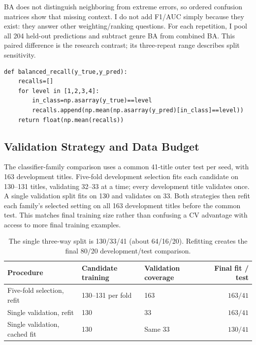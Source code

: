 \documentclass[11pt,letterpaper]{article}
\begin{document}
BA does not distinguish neighboring from extreme errors, so ordered confusion matrices show that missing context. I do not add F1/AUC simply because they exist: they answer other weighting/ranking questions. For each repetition, I pool all 204 held-out predictions and subtract genre BA from combined BA. This paired difference is the research contrast; its three-repeat range describes split sensitivity.

\begin{lstlisting}[caption={Manual balanced recall averages success within the four true categories; the notebook checks all pooled primary scores against this calculation.}]
def balanced_recall(y_true,y_pred):
    recalls=[]
    for level in [1,2,3,4]:
        in_class=np.asarray(y_true)==level
        recalls.append(np.mean(np.asarray(y_pred)[in_class]==level))
    return float(np.mean(recalls))
\end{lstlisting}


\subsection{Validation Strategy and Data Budget}
The classifier-family comparison uses a common 41-title outer test per seed, with 163 development titles. Five-fold development selection fits each candidate on 130--131 titles, validating 32--33 at a time; every development title validates once. A single validation split fits on 130 and validates on 33. Both strategies then refit each family's selected setting on all 163 development titles before the common test. This matches final training size rather than confusing a CV advantage with access to more final training examples.

\begin{table}[htbp]\centering\small
\begin{tabular}{@{}p{.31\linewidth}p{.23\linewidth}p{.20\linewidth}r@{}}\toprule
Procedure &Candidate training &Validation coverage &Final fit / test\\\midrule
Five-fold selection, refit&130--131 per fold&163&$163/41$\\
Single validation, refit&130&33&$163/41$\\
Single validation, cached fit&130&Same 33&$130/41$\\
\bottomrule\end{tabular}
\caption{The single three-way split is 130/33/41 (about 64/16/20). Refitting creates the final 80/20 development/test comparison.}\label{tab:allocation}\end{table}
\end{document}
